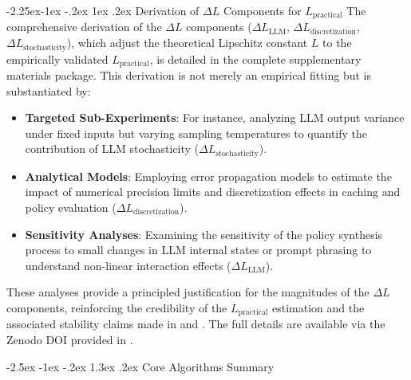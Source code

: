 \documentclass[manuscript,screen,review,anonymous,9pt]{acmart}
\makeatletter
\renewcommand\section{\@startsection{section}{1}{\z@}%
  {-2.5ex \@plus -1ex \@minus -.2ex}%
  {1.3ex \@plus.2ex}%
  {\normalfont\Large\bfseries}}
\renewcommand\subsection{\@startsection{subsection}{2}{\z@}%
  {-2.25ex\@plus -1ex \@minus -.2ex}%
  {1ex \@plus .2ex}%
  {\normalfont\large\bfseries}}
\makeatother
\begin{document}
\subsection{Derivation of \texorpdfstring{$\Delta L$}{Delta L} Components for \texorpdfstring{$L_{\text{practical}}$}{L\_practical}}
\label{app:delta_L_derivation}
The comprehensive derivation of the $\Delta L$ components ($\Delta L_{\text{LLM}}$, $\Delta L_{\text{discretization}}$, $\Delta L_{\text{stochasticity}}$), which adjust the theoretical Lipschitz constant $L$ to the empirically validated $L_{\text{practical}}$, is detailed in the complete supplementary materials package. This derivation is not merely an empirical fitting but is substantiated by:
\begin{itemize}[leftmargin=*,itemsep=1pt,parsep=1pt]
    \item \textbf{Targeted Sub-Experiments}: For instance, analyzing LLM output variance under fixed inputs but varying sampling temperatures to quantify the contribution of LLM stochasticity ($\Delta L_{\text{stochasticity}}$).
    \item \textbf{Analytical Models}: Employing error propagation models to estimate the impact of numerical precision limits and discretization effects in caching and policy evaluation ($\Delta L_{\text{discretization}}$).
    \item \textbf{Sensitivity Analyses}: Examining the sensitivity of the policy synthesis process to small changes in LLM internal states or prompt phrasing to understand non-linear interaction effects ($\Delta L_{\text{LLM}}$).
\end{itemize}
These analyses provide a principled justification for the magnitudes of the $\Delta L$ components, reinforcing the credibility of the $L_{\text{practical}}$ estimation and the associated stability claims made in  and . The full details are available via the Zenodo DOI provided in .

\section{Core Algorithms Summary}
\label{app:algorithms}
\end{document}

